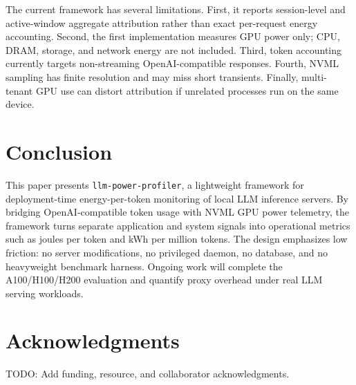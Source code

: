 \documentclass[conference]{IEEEtran}
\begin{document}
The current framework has several limitations. First, it reports session-level and active-window aggregate attribution rather than exact per-request energy accounting. Second, the first implementation measures GPU power only; CPU, DRAM, storage, and network energy are not included. Third, token accounting currently targets non-streaming OpenAI-compatible responses. Fourth, NVML sampling has finite resolution and may miss short transients. Finally, multi-tenant GPU use can distort attribution if unrelated processes run on the same device.

\section{Conclusion}

This paper presents \texttt{llm-power-profiler}, a lightweight framework for deployment-time energy-per-token monitoring of local LLM inference servers. By bridging OpenAI-compatible token usage with NVML GPU power telemetry, the framework turns separate application and system signals into operational metrics such as joules per token and kWh per million tokens. The design emphasizes low friction: no server modifications, no privileged daemon, no database, and no heavyweight benchmark harness. Ongoing work will complete the A100/H100/H200 evaluation and quantify proxy overhead under real LLM serving workloads.

\section*{Acknowledgments}

TODO: Add funding, resource, and collaborator acknowledgments.




\end{document}
